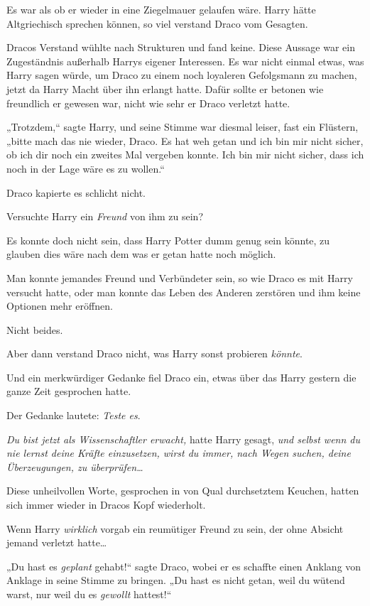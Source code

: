 {Es war als ob er wieder in eine Ziegelmauer gelaufen wäre. Harry hätte Altgriechisch sprechen können, so viel verstand Draco vom Gesagten.

Dracos Verstand wühlte nach Strukturen und fand keine. Diese Aussage war ein Zugeständnis außerhalb Harrys eigener Interessen. Es war nicht einmal etwas, was Harry sagen würde, um Draco zu einem noch loyaleren Gefolgsmann zu machen, jetzt da Harry Macht über ihn erlangt hatte. Dafür sollte er betonen wie freundlich er gewesen war, nicht wie sehr er Draco verletzt hatte.

„Trotzdem,“ sagte Harry, und seine Stimme war diesmal leiser, fast ein Flüstern, „bitte mach das nie wieder, Draco. Es hat weh getan und ich bin mir nicht sicher, ob ich dir noch ein zweites Mal vergeben konnte. Ich bin mir nicht sicher, dass ich noch in der Lage wäre es zu wollen.“

Draco kapierte es schlicht nicht.

Versuchte Harry ein \emph{Freund} von ihm zu sein?

Es konnte doch nicht sein, dass Harry Potter dumm genug sein könnte, zu glauben dies wäre nach dem was er getan hatte noch möglich.

Man konnte jemandes Freund und Verbündeter sein, so wie Draco es mit Harry versucht hatte, oder man konnte das Leben des Anderen zerstören und ihm keine Optionen mehr eröffnen.

Nicht beides.

Aber dann verstand Draco nicht, was Harry sonst probieren \emph{könnte}.

Und ein merkwürdiger Gedanke fiel Draco ein, etwas über das Harry gestern die ganze Zeit gesprochen hatte.

Der Gedanke lautete: \emph{Teste es}.

\emph{Du bist jetzt als Wissenschaftler erwacht,} hatte Harry gesagt, \emph{und selbst wenn du nie lernst deine Kräfte einzusetzen, wirst du immer, nach Wegen suchen, deine Überzeugungen, zu überprüfen…}

Diese unheilvollen Worte, gesprochen in von Qual durchsetztem Keuchen, hatten sich immer wieder in Dracos Kopf wiederholt.

Wenn Harry \emph{wirklich} vorgab ein reumütiger Freund zu sein, der ohne Absicht jemand verletzt hatte…

„Du hast es \emph{geplant} gehabt!“ sagte Draco, wobei er es schaffte einen Anklang von Anklage in seine Stimme zu bringen. „Du hast es nicht getan, weil du wütend warst, nur weil du es \emph{gewollt} hattest!“

}
